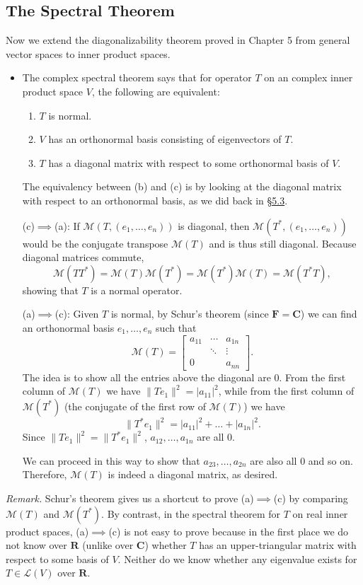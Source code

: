 \documentclass[11pt]{article}
\newcommand{\lk}[2]{\hyperlink{subsection.#1.#2}{\S#1.#2}}
\newcommand{\R}{\mathbf{R}}
\newcommand{\C}{\mathbf{C}}
\newcommand{\F}{\mathbf{F}}
\newcommand{\nm}[1]{\|#1\|}
\newcommand{\abs}[1]{\lvert #1 \rvert}
\newcommand{\LV}{\mathcal{L}(V)}
\newcommand{\M}{\mathcal{M}}
\begin{document}
\subsection{The Spectral Theorem}
Now we extend the diagonalizability theorem proved in Chapter 5 from general vector spaces to inner product spaces. 
\begin{itemize}
    \item The complex spectral theorem says that for operator $T$ on an complex inner product space $V$, the following are equivalent:
    \begin{enumerate}[label=(\alph*)]
        \item $T$ is normal.
        \item $V$ has an orthonormal basis consisting of eigenvectors of $T$.
        \item $T$ has a diagonal matrix with respect to some orthonormal basis of $V$.
    \end{enumerate}
    
    The equivalency between (b) and (c) is by looking at the diagonal matrix with respect to an orthonormal basis, as we did back in \lk{5}{3}.
    
    (c)$\implies$(a): If $\M(T,(e_1,\dots,e_n))$ is diagonal, then $\M(T^*,(e_1,\dots,e_n))$ would be the conjugate transpose $\M(T)$ and is thus still diagonal. Because diagonal matrices commute, $$\M(TT^*)=\M(T)\M(T^*)=\M(T^*)\M(T)=\M(T^*T),$$ showing that $T$ is a normal operator.
    
    (a)$\implies$(c): Given $T$ is normal, by Schur's theorem (since $\F = \C$) we can find an orthonormal basis $e_1,\dots,e_n$ such that
    \begin{equation*}
        \M(T)=
        \begin{bmatrix}
            a_{11} & \cdots & a_{1n} \\
            & \ddots & \vdots \\
            0 & & a_{nn}
        \end{bmatrix}.
    \end{equation*}
    The idea is to show all the entries above the diagonal are 0. From the first column of $\M(T)$ we have $\nm{Te_1}^2=\abs{a_{11}}^2$, while from the first column of $\M(T^*)$ (the conjugate of the first row of $\M(T)$) we have $$\nm{T^*e_1}^2=\abs{a_{11}}^2+\dots+\abs{a_{1n}}^2.$$ Since $\nm{Te_1}^2 = \nm{T^*e_1}^2$, $a_{12},\dots,a_{1n}$ are all 0.
    
    We can proceed in this way to show that $a_{23},\dots,a_{2n}$ are also all 0 and so on. Therefore, $\M(T)$ is indeed a diagonal matrix, as desired.
\end{itemize}
\textit{Remark.} Schur's theorem gives us a shortcut to prove (a)$\implies$(c) by comparing $\M(T)$ and $\M(T^*)$. By contrast, in the spectral theorem for $T$ on real inner product spaces, (a)$\implies$(c) is not easy to prove because in the first place we do not know over $\R$ (unlike over $\C$) whether $T$ has an upper-triangular matrix with respect to some basis of $V$. Neither do we know whether any eigenvalue exists for $T \in \LV$ over $\R$.
\end{document}
